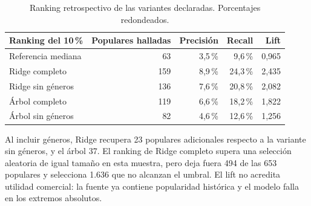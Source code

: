 \begin{table}[htbp]
\centering\small
\begin{tabular}{lrrrr}
\toprule
Ranking del 10\,\% & Populares halladas & Precisión & Recall & Lift \\
\midrule
Referencia mediana & 63 & 3,5\,\% & 9,6\,\% & 0,965 \\
Ridge completo & 159 & 8,9\,\% & 24,3\,\% & 2,435 \\
Ridge sin géneros & 136 & 7,6\,\% & 20,8\,\% & 2,082 \\
Árbol completo & 119 & 6,6\,\% & 18,2\,\% & 1,822 \\
Árbol sin géneros & 82 & 4,6\,\% & 12,6\,\% & 1,256 \\
\bottomrule
\end{tabular}
\caption{Ranking retrospectivo de las variantes declaradas. Porcentajes redondeados.}
\label{tab:kpi}
\end{table}

Al incluir géneros, Ridge recupera 23 populares adicionales respecto a la
variante sin géneros, y el árbol 37. El ranking de Ridge completo supera una
selección aleatoria de igual tamaño en esta muestra, pero deja fuera 494 de las
653 populares y selecciona 1.636 que no alcanzan el umbral. El lift no acredita
utilidad comercial: la fuente ya contiene popularidad histórica y el modelo
falla en los extremos absolutos.
